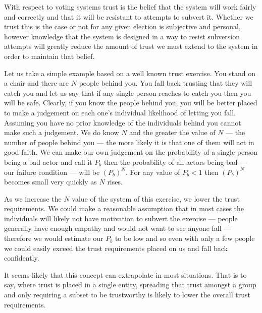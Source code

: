 With respect to voting systems trust is the belief that the system will work fairly and correctly and that it will be resistant to attempts to subvert it. Whether we trust this is the case or not for any given election is subjective and personal, however knowledge that the system is designed in a way to resist subversion attempts will greatly reduce the amount of trust we must extend to the system in order to maintain that belief.

Let us take a simple example based on a well known trust exercise. You stand on a chair and there are $N$ people behind you. You fall back trusting that they will catch you and let us say that if any single person reaches to catch you then you will be safe. Clearly, if you know the people behind you, you will be better placed to make a judgement on each one's individual likelihood of letting you fall. Assuming you have no prior knowledge of the individuals behind you cannot make such a judgement. We do know $N$ and the greater the value of $N$ --- the number of people behind you --- the more likely it is that one of them will act in good faith. We can make our own judgement on the probability of a single person being a bad actor and call it $P_b$ then the probability of all actors being bad --- our failure condition --- will be $(P_b)^N$. For any value of $P_b < 1$ then $(P_b)^N$ becomes small very quickly as $N$ rises.

As we increase the $N$ value of the system of this exercise, we lower the trust requirements. We could make a reasonable assumption that in most cases the individuals will likely not have motivation to subvert the exercise --- people generally have enough empathy and would not want to see anyone fall --- therefore we would estimate our $P_b$ to be low and so even with only a few people we could easily exceed the trust requirements placed on us and fall back confidently.

It seems likely that this concept can extrapolate in most situations. That is to say, where trust is placed in a single entity, spreading that trust amongst a group and only requiring a subset to be trustworthy is likely to lower the overall trust requirements.

